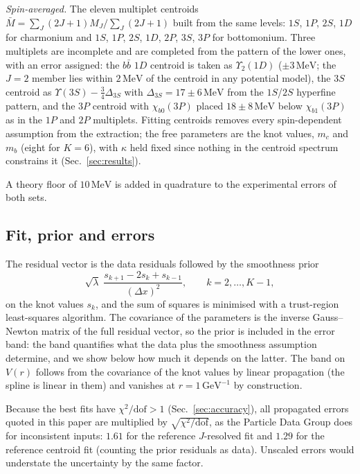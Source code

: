 \documentclass[10pt,twocolumn]{article}
\newcommand{\bb}{b\bar b}
\newcommand{\MeV}{\,\mathrm{MeV}}
\newcommand{\GeVi}{\,\mathrm{GeV}^{-1}}
\begin{document}
\emph{Spin-averaged.}
The eleven multiplet centroids $\bar M=\sum_J(2J+1)M_J/\sum_J(2J+1)$ built from the same levels: $1S$, $1P$, $2S$, $1D$ for charmonium and $1S$, $1P$, $2S$, $1D$, $2P$, $3S$, $3P$ for bottomonium.
Three multiplets are incomplete and are completed from the pattern of the lower ones, with an error assigned: the $\bb$ $1D$ centroid is taken as $\Upsilon_2(1D)$ ($\pm3\MeV$; the $J=2$ member lies within $2\MeV$ of the centroid in any potential model), the $3S$ centroid as $\Upsilon(3S)-\tfrac34\Delta_{3S}$ with $\Delta_{3S}=17\pm6\MeV$ from the $1S$/$2S$ hyperfine pattern, and the $3P$ centroid with $\chi_{b0}(3P)$ placed $18\pm8\MeV$ below $\chi_{b1}(3P)$ as in the $1P$ and $2P$ multiplets.
Fitting centroids removes every spin-dependent assumption from the extraction; the free parameters are the knot values, $m_c$ and $m_b$ (eight for $K=6$), with $\kappa$ held fixed since nothing in the centroid spectrum constrains it (Sec.~\ref{sec:results}).

A theory floor of $10\MeV$ is added in quadrature to the experimental errors of both sets.

\subsection{Fit, prior and errors}

The residual vector is the data residuals followed by the smoothness prior
\begin{equation}
  \sqrt\lambda\;\frac{s_{k+1}-2s_k+s_{k-1}}{(\Delta x)^2},\qquad k=2,\dots,K-1,
  \label{eq:prior}
\end{equation}
on the knot values $s_k$, and the sum of squares is minimised with a trust-region least-squares algorithm.
The covariance of the parameters is the inverse Gauss--Newton matrix of the full residual vector, so the prior is included in the error band: the band quantifies what the data plus the smoothness assumption determine, and we show below how much it depends on the latter.
The band on $V(r)$ follows from the covariance of the knot values by linear propagation (the spline is linear in them) and vanishes at $r=1\GeVi$ by construction.

Because the best fits have $\chi^2/\mathrm{dof}>1$ (Sec.~\ref{sec:accuracy}), all propagated errors quoted in this paper are multiplied by $\sqrt{\chi^2/\mathrm{dof}}$, as the Particle Data Group does for inconsistent inputs: $1.61$ for the reference $J$-resolved fit and $1.29$ for the reference centroid fit (counting the prior residuals as data).
Unscaled errors would understate the uncertainty by the same factor.
\end{document}
